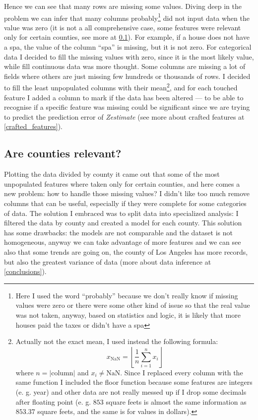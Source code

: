 Hence we can see that many rows are missing some values. Diving deep in the problem we can infer that many columns probably\footnote{Here I used the word ``probably'' because we don't really know if missing values were zero or there were some other kind of issue so that the real value was not taken, anyway, based on statistics and logic, it is likely that more houses paid the taxes or didn't have a spa} did not input data when the value was zero (it is not a all comprehensive case, some features were relevant only for certain counties, see more at \ref{counties_importance}). For example, if a house does not have a spa, the value of the column ``spa'' is missing, but it is not zero. For categorical data I decided to fill the missing values with zero, since it is the most likely value, while fill continuous data was more thought. Some columns are missing a lot of fields where others are just missing few hundreds or thousands of rows. I decided to fill the least unpopulated columns with their mean\footnote{Actually not the exact mean, I used instead the following formula:
$$
    x_{\text{NaN}} = \left\lfloor \frac{1}{n} \sum_{i=1}^{n} x_i \right\rfloor
$$
where $n = |\text{column}|$ and $x_i \neq \text{NaN}$. Since I replaced every column with the same function I included the floor function because some features are integers (e. g. year) and other data are not really messed up if I drop some decimals after floating point (e. g. $853$ square feets is almost the same information as $853.37$ square feets, and the same is for values in dollars).}, and for each touched feature I added a column to mark if the data has been altered --- to be able to recognise if a specific feature was missing could be significant since we are trying to predict the prediction error of \textit{Zestimate} (see more about crafted features at \ref{crafted_features}).

\subsection{Are counties relevant?}\label{counties_importance}

Plotting the data divided by county it came out that some of the most unpopulated features where taken only for certain counties, and here comes a new problem: how to handle those missing values? I didn't like too much remove columns that can be useful, especially if they were complete for some categories of data. The solution I embraced was to split data into specialized analysis: I filtered the data by county and created a model for each county.
This solution has some drawbacks: the models are not comparable and the dataset is not homogeneous, anyway we can take advantage of more features and we can see also that some trends are going on, the county of Los Angeles has more records, but also the greatest variance of data (more about data inference at \ref{conclusions}).
    
